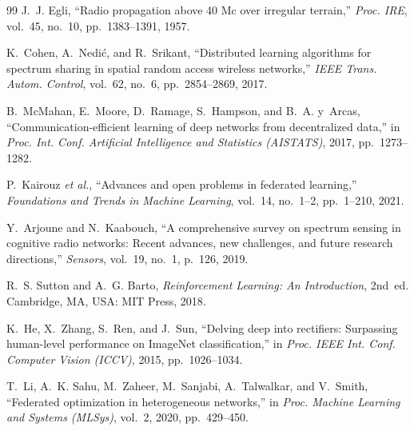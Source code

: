 \documentclass[journal]{IEEEtran}
\begin{document}
\begin{thebibliography}{99}
J.~J. Egli,
``Radio propagation above 40 Mc over irregular terrain,''
\emph{Proc. IRE}, vol.~45, no.~10, pp.~1383--1391, 1957.

K.~Cohen, A.~Nedi\'{c}, and R.~Srikant,
``Distributed learning algorithms for spectrum sharing in spatial random access
wireless networks,'' \emph{IEEE Trans. Autom. Control}, vol.~62, no.~6,
pp.~2854--2869, 2017.

B.~McMahan, E.~Moore, D.~Ramage, S.~Hampson, and B.~A. y~Arcas,
``Communication-efficient learning of deep networks from decentralized data,''
in \emph{Proc. Int. Conf. Artificial Intelligence and Statistics (AISTATS)},
2017, pp.~1273--1282.

P.~Kairouz \emph{et al.},
``Advances and open problems in federated learning,''
\emph{Foundations and Trends in Machine Learning}, vol.~14, no.~1--2,
pp.~1--210, 2021.

Y.~Arjoune and N.~Kaabouch,
``A comprehensive survey on spectrum sensing in cognitive radio networks: Recent
advances, new challenges, and future research directions,''
\emph{Sensors}, vol.~19, no.~1, p.~126, 2019.

R.~S. Sutton and A.~G. Barto,
\emph{Reinforcement Learning: An Introduction}, 2nd~ed.
Cambridge, MA, USA: MIT Press, 2018.

K.~He, X.~Zhang, S.~Ren, and J.~Sun,
``Delving deep into rectifiers: Surpassing human-level performance on
ImageNet classification,''
in \emph{Proc. IEEE Int. Conf. Computer Vision (ICCV)}, 2015, pp.~1026--1034.

T.~Li, A.~K. Sahu, M.~Zaheer, M.~Sanjabi, A.~Talwalkar, and V.~Smith,
``Federated optimization in heterogeneous networks,''
in \emph{Proc. Machine Learning and Systems (MLSys)}, vol.~2, 2020,
pp.~429--450.

\end{thebibliography}
\end{document}
